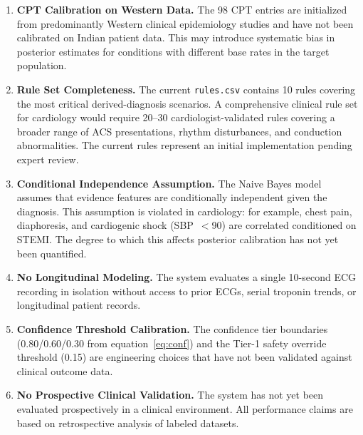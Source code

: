 \documentclass[journal]{IEEEtran}
\begin{document}
\begin{enumerate}
  \item \textbf{CPT Calibration on Western Data.}
        The 98 CPT entries are initialized from predominantly
        Western clinical epidemiology studies and have not been
        calibrated on Indian patient data.
        This may introduce systematic bias in posterior estimates
        for conditions with different base rates in the target
        population.

  \item \textbf{Rule Set Completeness.}
        The current \texttt{rules.csv} contains 10 rules covering
        the most critical derived-diagnosis scenarios.
        A comprehensive clinical rule set for cardiology would
        require 20–30 cardiologist-validated rules covering a
        broader range of ACS presentations, rhythm disturbances,
        and conduction abnormalities.
        The current rules represent an initial implementation
        pending expert review.

  \item \textbf{Conditional Independence Assumption.}
        The Naive Bayes model assumes that evidence features are
        conditionally independent given the diagnosis.
        This assumption is violated in cardiology: for example,
        chest pain, diaphoresis, and cardiogenic shock (SBP~$<$90)
        are correlated conditioned on STEMI.
        The degree to which this affects posterior calibration
        has not yet been quantified.

  \item \textbf{No Longitudinal Modeling.}
        The system evaluates a single 10-second ECG recording in
        isolation without access to prior ECGs, serial troponin
        trends, or longitudinal patient records.

  \item \textbf{Confidence Threshold Calibration.}
        The confidence tier boundaries
        (0.80/0.60/0.30 from equation~\ref{eq:conf}) and the
        Tier-1 safety override threshold (0.15) are engineering
        choices that have not been validated against clinical
        outcome data.

  \item \textbf{No Prospective Clinical Validation.}
        The system has not yet been evaluated prospectively in a
        clinical environment.
        All performance claims are based on retrospective
        analysis of labeled datasets.
\end{enumerate}
\end{document}
